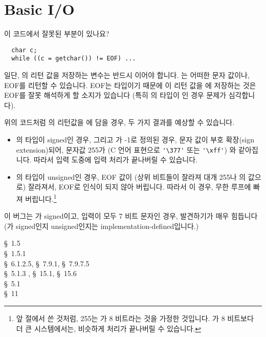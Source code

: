 \section{Basic I/O}	\label{sec:basicio}

%
%
\begin{faq}
	이 코드에서 잘못된 부분이 있나요?
\begin{verbatim}
  char c;
  while ((c = getchar()) != EOF) ...
\end{verbatim}
\A
	일단, 의 리턴 값을 저장하는 변수는 반드시 이어야
	합니다.  는 어떠한 문자 값이나, EOF를 리턴할 수 있습니다.
	EOF는  타입이기 때문에 이 리턴 값을 에 저장하는 것은
	EOF를 잘못 해석하게 할 소지가 있습니다 (특히 의 타입이
	인 경우 문제가 심각합니다).

	위의 코드처럼 의 리턴값을 에 담을 경우,
	두 가지 결과를 예상할 수 있습니다.

\begin{itemize}
	\item {}의 타입이 signed인 경우, 그리고 가 -1로
	정의된 경우, 문자 값이 부호 확장(sign extension)되어,
	문자값 255가 (C 언어 표현으로 \verb+'\377'+
	또는 \verb+'\xff'+) 와 같아집니다.  따라서 입력 도중에
	입력 처리가 끝나버릴 수 있습니다.

	\item {}의 타입이 unsigned인 경우, EOF 값이
	(상위 비트들이 잘라져 대개 255나 의 값으로) 잘라져서,
	EOF로 인식이 되지 않아 버립니다.  따라서 이 경우, 무한 루프에
	빠져 버립니다.\footnote{앞 절에서 쓴 것처럼, 255는 가
        8 비트라는 것을 가정한 것입니다. 가 8 비트보다 더 큰 
        시스템에서는, 비슷하게 처리가 끝나버릴 수 있습니다.}
\end{itemize}

	이 버그는 가 signed이고, 입력이 모두 7 비트 문자인 경우,
	발견하기가 매우 힘듭니다 (가 signed인지 unsigned인지는
	implementation-defined입니다.)

\R
	\cite{kr1} \S\ 1.5  \\
	\cite{kr2} \S\ 1.5.1  \\ 
	\cite{c89} \S\ 6.1.2.5, \S\ 7.9.1, \S\ 7.9.7.5 \\
	\cite{hs} \S\ 5.1.3 , \S\ 15.1, \S\ 15.6 \\
	\cite{ctp} \S\ 5.1  \\
	\cite{pcs} \S\ 11 
\end{faq}

